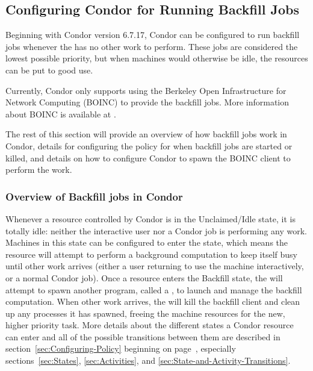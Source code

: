 \subsection{\label{sec:Backfill}Configuring Condor for Running Backfill Jobs} 


Beginning with Condor version 6.7.17, Condor can be configured to run
backfill jobs whenever the  has no other work to
perform.
These jobs are considered the lowest possible priority, but when
machines would otherwise be idle, the resources can be put to good 
use.

Currently, Condor only supports using the Berkeley Open Infrastructure
for Network Computing (BOINC) to provide the backfill jobs.
More information about BOINC is available at
.

The rest of this section will provide an overview of how backfill jobs
work in Condor, details for configuring the policy for when backfill
jobs are started or killed, and details on how to configure Condor to
spawn the BOINC client to perform the work.


\subsubsection{\label{sec:Backfill-Overview}Overview of Backfill jobs
in Condor}


Whenever a resource controlled by Condor is in the Unclaimed/Idle
state, it is totally idle: neither the interactive user nor a Condor
job is performing any work.
Machines in this state can be configured to enter the 
state, which means the resource will attempt to perform a background
computation to keep itself busy until other work arrives (either a 
user returning to use the machine interactively, or a normal Condor
job).
Once a resource enters the Backfill state, the  will
attempt to spawn another program, called a , to
launch and manage the backfill computation.
When other work arrives, the  will kill the backfill
client and clean up any processes it has spawned, freeing the machine
resources for the new, higher priority task.
More details about the different states a Condor resource can enter
and all of the possible transitions between them are described in
section~\ref{sec:Configuring-Policy} beginning on
page~\pageref{sec:Configuring-Policy}, especially
sections~\ref{sec:States}, \ref{sec:Activities}, and
\ref{sec:State-and-Activity-Transitions}.

